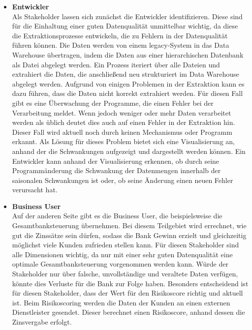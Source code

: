 \begin{itemize}
\item \textbf{Entwickler} \\            
Als Stakeholder lassen sich zunächst die Entwickler identifizieren.
Diese sind für die Einhaltung einer guten Datenqualität unmittelbar wichtig, da diese die Extraktionsprozesse entwickeln, die zu Fehlern in der Datenqualität führen können.
Die Daten werden von einem legacy-System in das Data Warehouse übertragen, indem die Daten aus einer hierarchischen Datenbank als Datei abgelegt werden.
Ein Prozess iteriert über alle Dateien und extrahiert die Daten, die anschließend neu strukturiert im Data Warehouse abgelegt werden.
Aufgrund von einigen Problemen in der Extraktion kann es dazu führen, dass die Daten nicht korrekt extrahiert werden.
Für diesen Fall gibt es eine Überwachung der Programme, die einen Fehler bei der Verarbeitung meldet.
Wenn jedoch weniger oder mehr Daten verarbeitet werden als üblich deutet dies auch auf einen Fehler in der Extraktion hin. 
Dieser Fall wird aktuell noch durch keinen Mechanismus oder Programm erkannt. 
Als Lösung für dieses Problem bietet sich eine Visualisierung an, anhand der die Schwankungen aufgezeigt und dargestellt werden können. 
Ein Entwickler kann anhand der Visualisierung erkennen, ob durch seine Programmänderung die Schwankung der Datenmengen innerhalb der saisonalen Schwankungen ist oder, ob seine Änderung einen neuen Fehler verursacht hat. 


\item \textbf{Business User}       \\
Auf der anderen Seite gibt es die Business User, die beispielsweise die Gesamtbanksteuerung übernehmen.
Bei diesem Teilgebiet wird errechnet, wie gut die Zinssätze sein dürfen, sodass die Bank Gewinn erzielt und gleichzeitig möglichst viele Kunden zufrieden stellen kann.
Für diesen Stakeholder sind alle Dimensionen wichtig, da nur mit einer sehr guten Datenqualität eine optimale Gesamtbanksteuerung vorgenommen werden kann. 
Würde der Stakeholder nur über falsche, unvollständige und veraltete Daten verfügen, könnte dies Verluste für die Bank zur Folge haben.
Besonders entscheidend ist für diesen Stakeholder, dass der Wert für den Risikoscore richtig und aktuell ist.
Beim Risikoscoring werden die Daten der Kunden an einen externen Dienstleister gesendet.
Dieser berechnet einen Risikoscore, anhand dessen die Zinsvergabe erfolgt.


\end{itemize}
